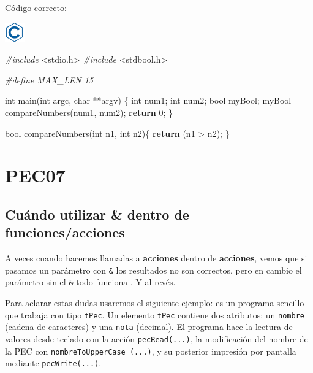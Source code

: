 \documentclass[
]{book}
\newenvironment{Shaded}{\begin{snugshade}}{\end{snugshade}}
\newcommand{\ControlFlowTok}[1]{\textcolor[rgb]{0.13,0.29,0.53}{\textbf{#1}}}
\newcommand{\DataTypeTok}[1]{\textcolor[rgb]{0.13,0.29,0.53}{#1}}
\newcommand{\DecValTok}[1]{\textcolor[rgb]{0.00,0.00,0.81}{#1}}
\newcommand{\ImportTok}[1]{#1}
\newcommand{\NormalTok}[1]{#1}
\newcommand{\PreprocessorTok}[1]{\textcolor[rgb]{0.56,0.35,0.01}{\textit{#1}}}
\begin{document}
Código correcto:

\includegraphics{./img/c.png}

\begin{Shaded}
\begin{Highlighting}[]
\PreprocessorTok{\#include }\ImportTok{\textless{}stdio.h\textgreater{}}
\PreprocessorTok{\#include }\ImportTok{\textless{}stdbool.h\textgreater{}}

\PreprocessorTok{\#define MAX\_LEN 15}

\DataTypeTok{int}\NormalTok{ main(}\DataTypeTok{int}\NormalTok{ argc, }\DataTypeTok{char}\NormalTok{ **argv) \{}
    \DataTypeTok{int}\NormalTok{ num1;}
    \DataTypeTok{int}\NormalTok{ num2;}
    \DataTypeTok{bool}\NormalTok{ myBool;}
\NormalTok{    myBool = compareNumbers(num1, num2);}
    \ControlFlowTok{return} \DecValTok{0}\NormalTok{;}
\NormalTok{\}}

\DataTypeTok{bool}\NormalTok{ compareNumbers(}\DataTypeTok{int}\NormalTok{ n1, }\DataTypeTok{int}\NormalTok{ n2)\{}
    \ControlFlowTok{return}\NormalTok{ (n1 \textgreater{} n2); }
\NormalTok{\}}
\end{Highlighting}
\end{Shaded}

\hypertarget{pec07}{%
\chapter{PEC07}\label{pec07}}

\hypertarget{cuuxe1ndo-utilizar-dentro-de-funcionesacciones}{%
\section{Cuándo utilizar \& dentro de funciones/acciones}\label{cuuxe1ndo-utilizar-dentro-de-funcionesacciones}}

A veces cuando hacemos llamadas a \textbf{acciones} dentro de \textbf{acciones}, vemos que si pasamos un parámetro con \texttt{\&} los resultados no son correctos, pero en cambio el parámetro sin el \texttt{\&} todo funciona . Y al revés.

Para aclarar estas dudas usaremos el siguiente ejemplo: es un programa sencillo que trabaja con tipo \texttt{tPec}. Un elemento \texttt{tPec} contiene dos atributos: un \texttt{nombre} (cadena de caracteres) y una \texttt{nota} (decimal). El programa hace la lectura de valores desde teclado con la acción \texttt{pecRead(...)}, la modificación del nombre de la PEC con \texttt{nombreToUpperCase\ (...)}, y su posterior impresión por pantalla mediante \texttt{pecWrite(...)}.
\end{document}
